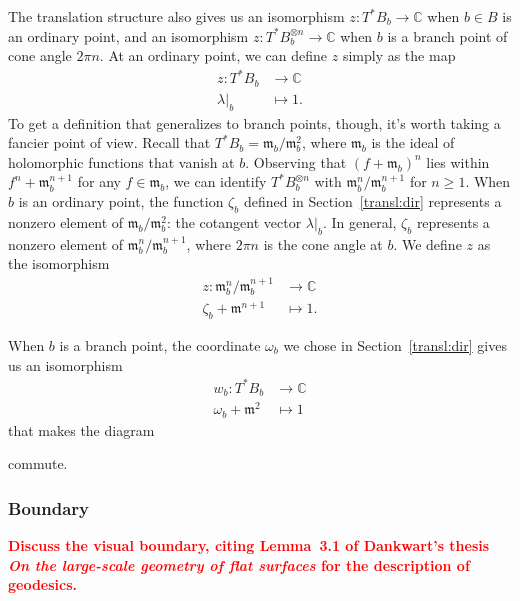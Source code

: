 \documentclass{article}
\theoremstyle{definition}
\newcommand{\maps}{\colon}
\newcommand{\C}{\mathbb{C}}
\newcommand{\blankbox}{{\fboxsep 0pt \colorbox{lightgray}{\phantom{$h$}}}}
\newcommand{\van}{\mathfrak{m}}
\begin{document}
The translation structure also gives us an isomorphism $z \maps T^*B_b \to \C$ when $b \in B$ is an ordinary point, and an isomorphism $z \maps T^*B_b^{\otimes n} \to \C$ when $b$ is a branch point of cone angle $2\pi n$. At an ordinary point, we can define $z$ simply as the map
\begin{align*}
z \maps T^*B_b & \to \C \\
\lambda\big|_b & \mapsto 1.
\end{align*}
To get a definition that generalizes to branch points, though, it's worth taking a fancier point of view. Recall that $T^*B_b = \van_b / \van_b^2$, where $\van_b$ is the ideal of holomorphic functions that vanish at $b$. Observing that $(f + \van_b)^n$ lies within $f^n + \van_b^{n+1}$ for any $f \in \van_b$, we can identify $T^*B_b^{\otimes n}$ with $\van_b^n / \van_b^{n+1}$ for $n \ge 1$. When $b$ is an ordinary point, the function $\zeta_b$ defined in Section~\ref{transl:dir} represents a nonzero element of $\van_b / \van_b^2$: the cotangent vector $\lambda\big|_b$. In general, $\zeta_b$ represents a nonzero element of $\van_b^n / \van_b^{n+1}$, where $2\pi n$ is the cone angle at $b$. We define $z$ as the isomorphism
\begin{align*}
z \maps \van_b^n / \van_b^{n+1} & \to \C \\
\zeta_b + \van^{n+1} & \mapsto 1.
\end{align*}

When $b$ is a branch point, the coordinate $\omega_b$ we chose in Section~\ref{transl:dir} gives us an isomorphism
\begin{align*}
w_b \maps T^*B_b & \to \C \\
\omega_b + \van^2 & \mapsto 1
\end{align*}
that makes the diagram
\begin{center}
\end{center}
commute.
\subsubsection{Boundary}
\textcolor{red}{\textbf{Discuss the visual boundary, citing Lemma~3.1 of Dankwart's thesis \textit{On the large-scale geometry of flat surfaces} for the description of geodesics.}}
\end{document}
